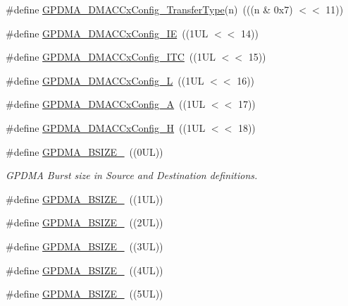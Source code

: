 \begin{DoxyCompactItemize}
\item 
\#define \hyperlink{group__GPDMA__17XX__40XX_ga63bace54233ed2446a1b442b46243833}{G\-P\-D\-M\-A\-\_\-\-D\-M\-A\-C\-Cx\-Config\-\_\-\-Transfer\-Type}(n)~(((n \& 0x7) $<$$<$ 11))
\item 
\#define \hyperlink{group__GPDMA__17XX__40XX_ga0fb4c3e9768c0a757b6ff25f77b75a26}{G\-P\-D\-M\-A\-\_\-\-D\-M\-A\-C\-Cx\-Config\-\_\-\-I\-E}~((1\-U\-L $<$$<$ 14))
\item 
\#define \hyperlink{group__GPDMA__17XX__40XX_gac7c379cbf11a214f436620e4f7a7ee2a}{G\-P\-D\-M\-A\-\_\-\-D\-M\-A\-C\-Cx\-Config\-\_\-\-I\-T\-C}~((1\-U\-L $<$$<$ 15))
\item 
\#define \hyperlink{group__GPDMA__17XX__40XX_ga37a55c8ebde3d56defbf6281534237fe}{G\-P\-D\-M\-A\-\_\-\-D\-M\-A\-C\-Cx\-Config\-\_\-\-L}~((1\-U\-L $<$$<$ 16))
\item 
\#define \hyperlink{group__GPDMA__17XX__40XX_gae28eb1e74ecafc5e6170e3f7a8688335}{G\-P\-D\-M\-A\-\_\-\-D\-M\-A\-C\-Cx\-Config\-\_\-\-A}~((1\-U\-L $<$$<$ 17))
\item 
\#define \hyperlink{group__GPDMA__17XX__40XX_ga987a4bb2d26cf2ef476483f347ad49ff}{G\-P\-D\-M\-A\-\_\-\-D\-M\-A\-C\-Cx\-Config\-\_\-\-H}~((1\-U\-L $<$$<$ 18))
\item 
\#define \hyperlink{group__GPDMA__17XX__40XX_gafd44c148b998d28bc156b947794ad011}{G\-P\-D\-M\-A\-\_\-\-B\-S\-I\-Z\-E\-\_}~((0\-U\-L))
\begin{DoxyCompactList}\small\item\em G\-P\-D\-M\-A Burst size in Source and Destination definitions. \end{DoxyCompactList}\item 
\#define \hyperlink{group__GPDMA__17XX__40XX_ga768f1f0d1cf1a2611573362ed7b6a18d}{G\-P\-D\-M\-A\-\_\-\-B\-S\-I\-Z\-E\-\_}~((1\-U\-L))
\item 
\#define \hyperlink{group__GPDMA__17XX__40XX_ga21239562985215b67c024871f804f0bd}{G\-P\-D\-M\-A\-\_\-\-B\-S\-I\-Z\-E\-\_}~((2\-U\-L))
\item 
\#define \hyperlink{group__GPDMA__17XX__40XX_ga6a56379136d5416a0799642fa2217fe2}{G\-P\-D\-M\-A\-\_\-\-B\-S\-I\-Z\-E\-\_}~((3\-U\-L))
\item 
\#define \hyperlink{group__GPDMA__17XX__40XX_ga2ebaf7a771f5bf603ecfed0503a66c5c}{G\-P\-D\-M\-A\-\_\-\-B\-S\-I\-Z\-E\-\_}~((4\-U\-L))
\item 
\#define \hyperlink{group__GPDMA__17XX__40XX_gababd7d98382dd69ae09a9a4b447a0977}{G\-P\-D\-M\-A\-\_\-\-B\-S\-I\-Z\-E\-\_}~((5\-U\-L))
\item 

\end{DoxyCompactItemize}
